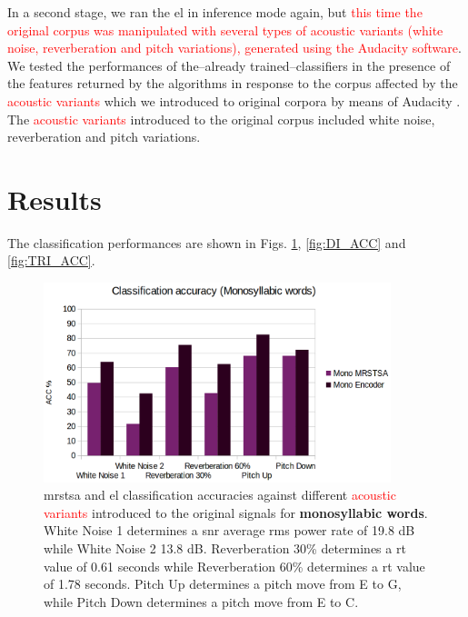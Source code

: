 \documentclass[10pt,letterpaper]{article}
\begin{document}
\pagebreak

In a second stage, we ran the \gls{el} in inference mode again, but \textcolor{red}{this time the original corpus was manipulated with several types of acoustic variants (white noise, reverberation and pitch variations), generated using the Audacity software}. We tested the performances of the--already trained--classifiers in the presence of the features returned by the algorithms in response to the corpus affected by the \textcolor{red}{acoustic variants} which we introduced to original corpora by means of Audacity \cite{audacity}. The \textcolor{red}{acoustic variants} introduced to the original corpus included white noise, reverberation and pitch variations. 











\section*{Results}

The classification performances are shown in Figs. \ref{fig:MONO_ACC}, \ref{fig:DI_ACC} and \ref{fig:TRI_ACC}.

\begin{figure}[h!]
    \centering
    \includegraphics[width=0.9\textwidth]{MONO_ACC.png}
    \caption{\gls{mrstsa} and \gls{el} classification accuracies against different \textcolor{red}{acoustic variants} introduced to the original signals
    for \textbf{monosyllabic words}.
    White Noise 1 determines a \gls{snr} average \gls{rms} power rate of 19.8 dB while White Noise 2 13.8 dB.
    Reverberation 30\% determines a \gls{rt} value of 0.61 seconds while Reverberation 60\% determines a \gls{rt} value of 1.78 seconds.
    Pitch Up determines a pitch move from E to G, while Pitch Down determines a pitch move from E to C.}
    \label{fig:MONO_ACC}
\end{figure}
\end{document}
